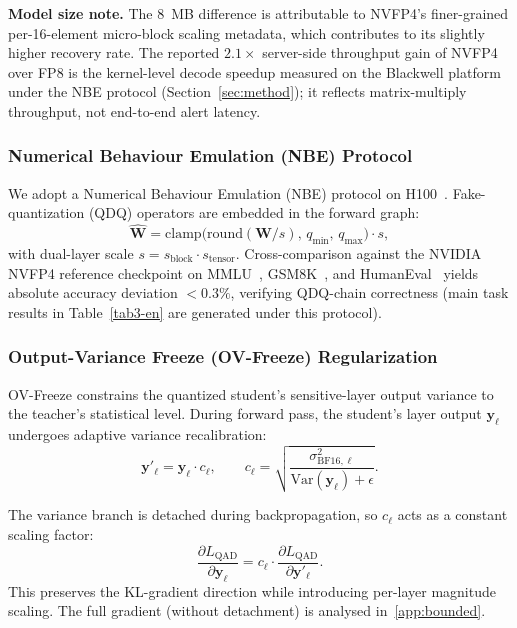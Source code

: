 \documentclass[final,5p,times,number]{elsarticle}
\begin{document}
\noindent\textbf{Model size note.} The 8~MB difference is attributable to NVFP4's finer-grained per-16-element micro-block scaling metadata, which contributes to its slightly higher recovery rate. The reported $2.1\times$ server-side throughput gain of NVFP4 over FP8 is the kernel-level decode speedup measured on the Blackwell platform under the NBE protocol (Section~\ref{sec:method}); it reflects matrix-multiply throughput, not end-to-end alert latency.

\subsubsection{Numerical Behaviour Emulation (NBE) Protocol}

We adopt a Numerical Behaviour Emulation (NBE) protocol on H100~\cite{NVIDIA2024TRTLLMReleaseNotes,NVIDIA2024TensorRTLLMDocs}. Fake-quantization (QDQ) operators are embedded in the forward graph:
\begin{equation}
\label{eq:nbe}
\widehat{\bm{W}} = \mathrm{clamp}\!\bigl(\mathrm{round}(\bm{W}/s),\,q_{\min},\,q_{\max}\bigr)\cdot s,
\end{equation}
with dual-layer scale $s = s_{\text{block}}\!\cdot\!s_{\text{tensor}}$. Cross-comparison against the NVIDIA NVFP4 reference checkpoint on MMLU~\cite{30}, GSM8K~\cite{31}, and HumanEval~\cite{32} yields absolute accuracy deviation $<0.3\%$, verifying QDQ-chain correctness (main task results in Table~\ref{tab3-en} are generated under this protocol).

\subsubsection{Output-Variance Freeze (OV-Freeze) Regularization}\label{sec:ovfreeze-method}

OV-Freeze constrains the quantized student's sensitive-layer output variance to the teacher's statistical level. During forward pass, the student's layer output $\bm{y}_\ell$ undergoes adaptive variance recalibration:
\begin{equation}
\label{eq:ovf-rescale-en}
\bm{y}'_\ell = \bm{y}_\ell\cdot c_\ell, \qquad c_\ell = \sqrt{\frac{\sigma^2_{\mathrm{BF16},\ell}}{\mathrm{Var}(\bm{y}_\ell) + \epsilon}}.
\end{equation}

The variance branch is detached during backpropagation, so $c_\ell$ acts as a constant scaling factor:
\begin{equation}
\label{eq:ovf-detach-en}
\frac{\partial L_{\mathrm{QAD}}}{\partial\bm{y}_\ell} = c_\ell\cdot\frac{\partial L_{\mathrm{QAD}}}{\partial\bm{y}'_\ell}.
\end{equation}
This preserves the KL-gradient direction while introducing per-layer magnitude scaling. The full gradient (without detachment) is analysed in~\ref{app:bounded}.
\end{document}
